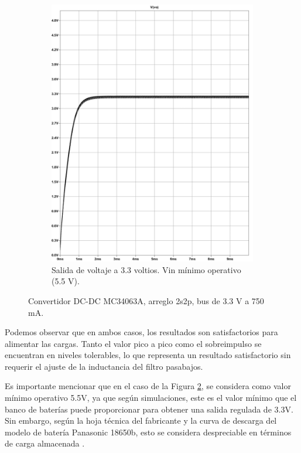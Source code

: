 \begin{figure}[h]
\begin{subfigure}{0.48\linewidth}
    \includegraphics[width=\textwidth]{Pictures/Convertidor DC-DC MC34063A, 2s2p, bus 3.3 v a 750 mA_page-0001 Min.jpg}
    \caption{Salida de voltaje a 3.3 voltios. Vin mínimo operativo (5.5 V).}
    \label{fig:2s2p_33v_2dcdcconverters_min}
  \end{subfigure}
  \caption{Convertidor DC-DC MC34063A, arreglo 2s2p, bus de 3.3 V a 750 mA.}
\end{figure}

\newpage

Podemos observar que en ambos casos, los resultados son satisfactorios para alimentar las cargas. Tanto el valor pico a pico como el sobreimpulso se encuentran en niveles tolerables, lo que representa un resultado satisfactorio sin requerir el ajuste de la inductancia del filtro pasabajos.

Es importante mencionar que en el caso de la Figura \ref{fig:2s2p_33v_2dcdcconverters_min}, se considera como valor mínimo operativo 5.5V, ya que según simulaciones, este es el valor mínimo que el banco de baterías puede proporcionar para obtener una salida regulada de 3.3V. Sin embargo, según la hoja técnica del fabricante y la curva de descarga del modelo de batería Panasonic 18650b, esto se considera despreciable en términos de carga almacenada \cite{panasonic_18650b}.

